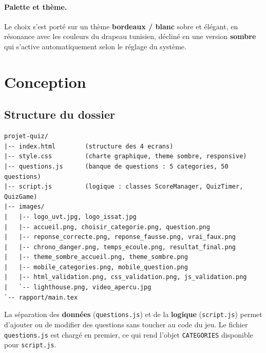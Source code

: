 \documentclass[11pt,a4paper]{article}
\begin{document}
\paragraph{Palette et thème.} Le choix s'est porté sur un thème \textbf{bordeaux / blanc}
sobre et élégant, en résonance avec les couleurs du drapeau tunisien, décliné en une
version \textbf{sombre} qui s'active automatiquement selon le réglage du système.

\clearpage
\section{Conception}
\subsection{Structure du dossier}
\begin{lstlisting}[caption={Arborescence du projet},numbers=none]
projet-quiz/
|-- index.html        (structure des 4 ecrans)
|-- style.css         (charte graphique, theme sombre, responsive)
|-- questions.js      (banque de questions : 5 categories, 50 questions)
|-- script.js         (logique : classes ScoreManager, QuizTimer, QuizGame)
|-- images/
|   |-- logo_uvt.jpg, logo_issat.jpg
|   |-- accueil.png, choisir_categorie.png, question.png
|   |-- reponse_correcte.png, reponse_fausse.png, vrai_faux.png
|   |-- chrono_danger.png, temps_ecoule.png, resultat_final.png
|   |-- theme_sombre_accueil.png, theme_sombre.png
|   |-- mobile_categories.png, mobile_question.png
|   |-- html_validation.png, css_validation.png, js_validation.png
|   `-- lighthouse.png, video_apercu.jpg
`-- rapport/main.tex
\end{lstlisting}

La séparation des \textbf{données} (\texttt{questions.js}) et de la \textbf{logique}
(\texttt{script.js}) permet d'ajouter ou de modifier des questions sans toucher au code du
jeu. Le fichier \texttt{questions.js} est chargé en premier, ce qui rend l'objet
\texttt{CATEGORIES} disponible pour \texttt{script.js}.
\end{document}
